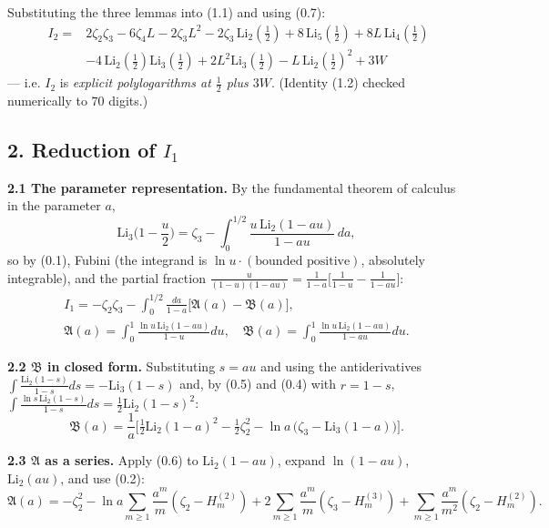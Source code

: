 \documentclass[11pt]{article}
\theoremstyle{remark}
\begin{document}
Substituting the three lemmas into (1.1) and using (0.7):
\begin{equation*}
\boxed{\;
\begin{aligned}
I_2={}&2\zeta_2\zeta_3-6\zeta_4L-2\zeta_3L^2-2\zeta_3\,\mathrm{Li}_2(\tfrac12)
+8\,\mathrm{Li}_5(\tfrac12)+8L\,\mathrm{Li}_4(\tfrac12)\\
&-4\,\mathrm{Li}_2(\tfrac12)\mathrm{Li}_3(\tfrac12)
+2L^2\mathrm{Li}_3(\tfrac12)-L\,\mathrm{Li}_2(\tfrac12)^2+3W\;
\end{aligned}} \tag{1.2}
\end{equation*}
--- i.e. $I_2$ is \textit{explicit polylogarithms at $\tfrac12$ plus $3W$}. (Identity (1.2) checked numerically to $70$ digits.)

\subsection*{2. Reduction of $I_1$}

\textbf{2.1 The parameter representation.} By the fundamental theorem of calculus in the parameter $a$,
\[
\mathrm{Li}_3\Big(1-\frac u2\Big)=\zeta_3-\int_0^{1/2}\frac{u\,\mathrm{Li}_2(1-au)}{1-au}\,da ,
\]
so by (0.1), Fubini (the integrand is $\ln u\cdot(\text{bounded positive})$, absolutely integrable), and the partial fraction
$\frac{u}{(1-u)(1-au)}=\frac1{1-a}\big[\frac1{1-u}-\frac1{1-au}\big]$:
\begin{equation*}
\begin{gathered}
I_1=-\zeta_2\zeta_3-\int_0^{1/2}\frac{da}{1-a}\Big[\mathfrak A(a)-\mathfrak B(a)\Big],\\
\mathfrak A(a)=\int_0^1\frac{\ln u\,\mathrm{Li}_2(1-au)}{1-u}du,\quad
\mathfrak B(a)=\int_0^1\frac{\ln u\,\mathrm{Li}_2(1-au)}{1-au}du.
\end{gathered} \tag{2.1}
\end{equation*}

\textbf{2.2 $\mathfrak B$ in closed form.} Substituting $s=au$ and using the antiderivatives $\int\frac{\mathrm{Li}_2(1-s)}{1-s}ds=-\mathrm{Li}_3(1-s)$ and, by (0.5) and (0.4) with $r=1-s$, $\int\frac{\ln s\,\mathrm{Li}_2(1-s)}{1-s}ds=\tfrac12\mathrm{Li}_2(1-s)^2$:
\begin{equation*}
\mathfrak B(a)=\frac1a\Big[\tfrac12\mathrm{Li}_2(1-a)^2-\tfrac12\zeta_2^2-\ln a\,\big(\zeta_3-\mathrm{Li}_3(1-a)\big)\Big]. \tag{2.2}
\end{equation*}

\textbf{2.3 $\mathfrak A$ as a series.} Apply (0.6) to $\mathrm{Li}_2(1-au)$, expand $\ln(1-au)$, $\mathrm{Li}_2(au)$, and use (0.2):
\begin{equation*}
\mathfrak A(a)=-\zeta_2^2-\ln a\sum_{m\ge1}\frac{a^m}{m}(\zeta_2-H^{(2)}_m)
+2\sum_{m\ge1}\frac{a^m}{m}(\zeta_3-H^{(3)}_m)+\sum_{m\ge1}\frac{a^m}{m^2}(\zeta_2-H^{(2)}_m). \tag{2.3}
\end{equation*}
\end{document}
